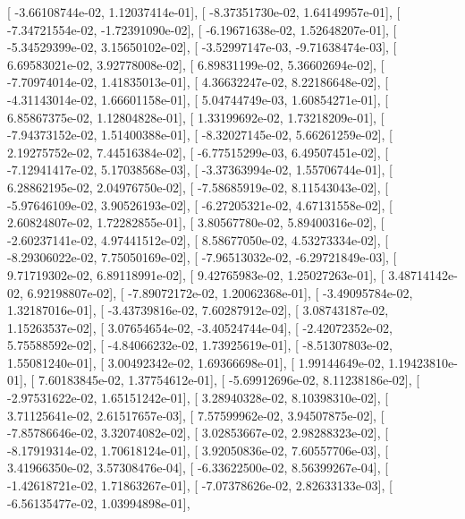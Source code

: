 \documentclass{article}
\begin{document}
       [ -3.66108744e-02,   1.12037414e-01],
       [ -8.37351730e-02,   1.64149957e-01],
       [ -7.34721554e-02,  -1.72391090e-02],
       [ -6.19671638e-02,   1.52648207e-01],
       [ -5.34529399e-02,   3.15650102e-02],
       [ -3.52997147e-03,  -9.71638474e-03],
       [  6.69583021e-02,   3.92778008e-02],
       [  6.89831199e-02,   5.36602694e-02],
       [ -7.70974014e-02,   1.41835013e-01],
       [  4.36632247e-02,   8.22186648e-02],
       [ -4.31143014e-02,   1.66601158e-01],
       [  5.04744749e-03,   1.60854271e-01],
       [  6.85867375e-02,   1.12804828e-01],
       [  1.33199692e-02,   1.73218209e-01],
       [ -7.94373152e-02,   1.51400388e-01],
       [ -8.32027145e-02,   5.66261259e-02],
       [  2.19275752e-02,   7.44516384e-02],
       [ -6.77515299e-03,   6.49507451e-02],
       [ -7.12941417e-02,   5.17038568e-03],
       [ -3.37363994e-02,   1.55706744e-01],
       [  6.28862195e-02,   2.04976750e-02],
       [ -7.58685919e-02,   8.11543043e-02],
       [ -5.97646109e-02,   3.90526193e-02],
       [ -6.27205321e-02,   4.67131558e-02],
       [  2.60824807e-02,   1.72282855e-01],
       [  3.80567780e-02,   5.89400316e-02],
       [ -2.60237141e-02,   4.97441512e-02],
       [  8.58677050e-02,   4.53273334e-02],
       [ -8.29306022e-02,   7.75050169e-02],
       [ -7.96513032e-02,  -6.29721849e-03],
       [  9.71719302e-02,   6.89118991e-02],
       [  9.42765983e-02,   1.25027263e-01],
       [  3.48714142e-02,   6.92198807e-02],
       [ -7.89072172e-02,   1.20062368e-01],
       [ -3.49095784e-02,   1.32187016e-01],
       [ -3.43739816e-02,   7.60287912e-02],
       [  3.08743187e-02,   1.15263537e-02],
       [  3.07654654e-02,  -3.40524744e-04],
       [ -2.42072352e-02,   5.75588592e-02],
       [ -4.84066232e-02,   1.73925619e-01],
       [ -8.51307803e-02,   1.55081240e-01],
       [  3.00492342e-02,   1.69366698e-01],
       [  1.99144649e-02,   1.19423810e-01],
       [  7.60183845e-02,   1.37754612e-01],
       [ -5.69912696e-02,   8.11238186e-02],
       [ -2.97531622e-02,   1.65151242e-01],
       [  3.28940328e-02,   8.10398310e-02],
       [  3.71125641e-02,   2.61517657e-03],
       [  7.57599962e-02,   3.94507875e-02],
       [ -7.85786646e-02,   3.32074082e-02],
       [  3.02853667e-02,   2.98288323e-02],
       [ -8.17919314e-02,   1.70618124e-01],
       [  3.92050836e-02,   7.60557706e-03],
       [  3.41966350e-02,   3.57308476e-04],
       [ -6.33622500e-02,   8.56399267e-04],
       [ -1.42618721e-02,   1.71863267e-01],
       [ -7.07378626e-02,   2.82633133e-03],
       [ -6.56135477e-02,   1.03994898e-01],
\end{document}

